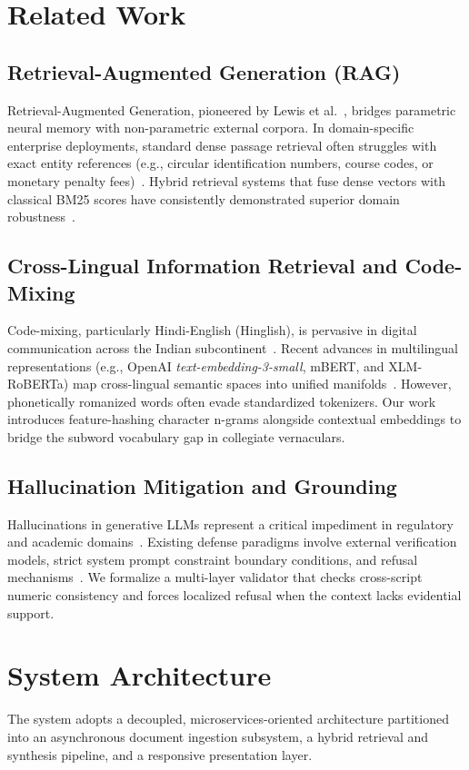 \documentclass[conference]{IEEEtran}
\begin{document}
\section{Related Work}
\subsection{Retrieval-Augmented Generation (RAG)}
Retrieval-Augmented Generation, pioneered by Lewis et al.~\cite{lewis2020rag}, bridges parametric neural memory with non-parametric external corpora. In domain-specific enterprise deployments, standard dense passage retrieval often struggles with exact entity references (e.g., circular identification numbers, course codes, or monetary penalty fees)~\cite{karpukhin2020dpr}. Hybrid retrieval systems that fuse dense vectors with classical BM25 scores have consistently demonstrated superior domain robustness~\cite{robertson2009bm25, gao2023modular}.

\subsection{Cross-Lingual Information Retrieval and Code-Mixing}
Code-mixing, particularly Hindi-English (Hinglish), is pervasive in digital communication across the Indian subcontinent~\cite{bali2014borrowing}. Recent advances in multilingual representations (e.g., OpenAI \textit{text-embedding-3-small}, mBERT, and XLM-RoBERTa) map cross-lingual semantic spaces into unified manifolds~\cite{conneau2020unsupervised}. However, phonetically romanized words often evade standardized tokenizers. Our work introduces feature-hashing character n-grams alongside contextual embeddings to bridge the subword vocabulary gap in collegiate vernaculars.

\subsection{Hallucination Mitigation and Grounding}
Hallucinations in generative LLMs represent a critical impediment in regulatory and academic domains~\cite{ji2023hallucination}. Existing defense paradigms involve external verification models, strict system prompt constraint boundary conditions, and refusal mechanisms~\cite{shuster2021retrieval}. We formalize a multi-layer validator that checks cross-script numeric consistency and forces localized refusal when the context lacks evidential support.

\section{System Architecture}
The system adopts a decoupled, microservices-oriented architecture partitioned into an asynchronous document ingestion subsystem, a hybrid retrieval and synthesis pipeline, and a responsive presentation layer.
\end{document}
